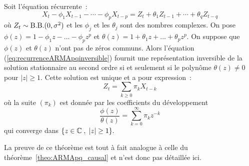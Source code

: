 \begin{theorem}
 \label{theo:ARMAinversible}
Soit l'\'equation r\'ecurrente~:
\begin{equation}
 \label{eq:recurrenceARMApqinversible}
  X_t - \phi_1 X_{t-1} - \cdots - \phi_p X_{t-p}
  =
  Z_t + \theta_1 Z_{t-1} + \cdots + \theta_q Z_{t-q}
\end{equation} o\`u $Z_t \sim \mathrm{B.B.}(0,\sigma^2)$ et les
$\phi_j$ et les $\theta_j$ sont des nombres complexes. On pose
$\phi(z)= 1 - \phi_1 z - \dots - \phi_p z^p$ et $\theta(z)= 1 +
\theta_1 z + \dots + \theta_p z^p$. On suppose que $\phi(z)$ et
$\theta(z)$ n'ont pas de z\'eros communs. Alors l'\'equation
(\ref{eq:recurrenceARMApqinversible}) fournit une repr\'esentation inversible
de la solution stationnaire au second ordre si et seulement si le polyn\^ome $\theta(z)
\neq 0$ pour $|z| \geq 1$. Cette solution est unique et a pour
expression~:
\begin{equation}
 \label{eq:solutionARMApq_inversible}
  Z_t = \sum_{k\geq 0} \pi_k X_{t-k}
\end{equation}
o\`u la suite $(\pi_k)$ est donn\'ee par les coefficients du d\'eveloppement
$$
\frac{\phi(z)}{\theta(z)}=\sum_{k=0}^{\infty} \pi_k z^{-k}
$$
qui converge dans $\{z\in\mathbb{C}\;,\;|z|\geq 1\}.$
\end{theorem}
La preuve de ce th\'eor\`eme est tout \`a fait analogue \`a celle du
th\'eor\`eme~\ref{theo:ARMApq_causal} et n'est donc pas d\'etaill\'ee ici.

